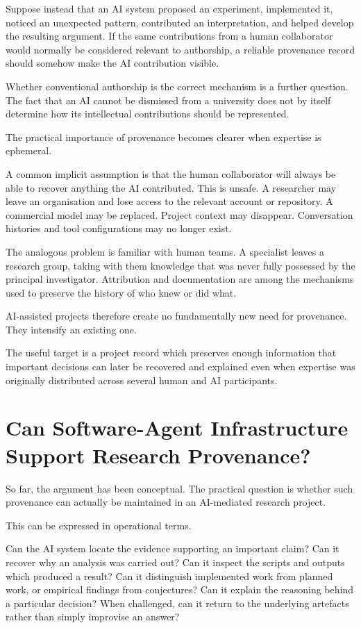 Suppose instead that an AI system proposed an experiment, implemented it, noticed an unexpected pattern, contributed an interpretation, and helped develop the resulting argument. If the same contributions from a human collaborator would normally be considered relevant to authorship, a reliable provenance record should somehow make the AI contribution visible.

Whether conventional authorship is the correct mechanism is a further question. The fact that an AI cannot be dismissed from a university does not by itself determine how its intellectual contributions should be represented.

The practical importance of provenance becomes clearer when expertise is ephemeral.

A common implicit assumption is that the human collaborator will always be able to recover anything the AI contributed. This is unsafe. A researcher may leave an organisation and lose access to the relevant account or repository. A commercial model may be replaced. Project context may disappear. Conversation histories and tool configurations may no longer exist.

The analogous problem is familiar with human teams. A specialist leaves a research group, taking with them knowledge that was never fully possessed by the principal investigator. Attribution and documentation are among the mechanisms used to preserve the history of who knew or did what.

AI-assisted projects therefore create no fundamentally new need for provenance. They intensify an existing one.

The useful target is a project record which preserves enough information that important decisions can later be recovered and explained even when expertise was originally distributed across several human and AI participants.


\section{Can Software-Agent Infrastructure Support Research Provenance?}

So far, the argument has been conceptual. The practical question is whether such provenance can actually be maintained in an AI-mediated research project.

This can be expressed in operational terms.

Can the AI system locate the evidence supporting an important claim? Can it recover why an analysis was carried out? Can it inspect the scripts and outputs which produced a result? Can it distinguish implemented work from planned work, or empirical findings from conjectures? Can it explain the reasoning behind a particular decision? When challenged, can it return to the underlying artefacts rather than simply improvise an answer?

